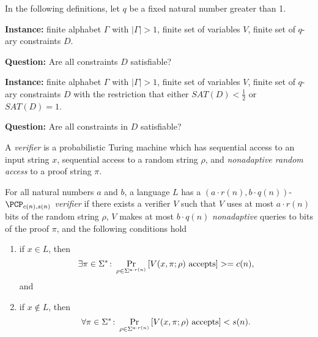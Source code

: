 \documentclass[]{article}
\begin{document}
In the following definitions, let $q$ be a fixed natural number greater than 1.

\begin{definition}
  \mbox{}

  \textbf{Instance:} finite alphabet $\Gamma$ with $|\Gamma| > 1$, finite set of variables $V$, finite set of $q$-ary constraints $D$.

  \textbf{Question:} Are all constraints $D$ satisfiable?
\end{definition}

\begin{definition}
  \mbox{}

  \textbf{Instance:} finite alphabet $\Gamma$ with $|\Gamma| > 1$, finite set of variables $V$, finite set of $q$-ary constraints $D$ with the restriction that either $SAT(D) < \frac{1}{2}$ or $SAT(D) = 1$.

  \textbf{Question:} Are all constraints in $D$ satisfiable?
\end{definition}

\begin{definition}
  A \emph{\PCP{} verifier} is a probabilistic Turing machine which has sequential access to an input string $x$, sequential access to a random string $\rho$, and \emph{nonadaptive random access} to a proof string $\pi$.
\end{definition}

\begin{definition}
  For all natural numbers $a$ and $b$, a language $L$ has a $(a \cdot r(n), b \cdot q(n))$-\emph{$\PCP_{c(n), s(n)}$ verifier} if there exists a \PCP{} verifier $V$ such that $V$ uses at most $a \cdot r(n)$ bits of the random string $\rho$, $V$ makes at most $b \cdot q(n)$ \emph{nonadaptive} queries to bits of the proof $\pi$, and the following conditions hold
  \begin{enumerate}
  \item if $x \in L$, then
    \begin{equation*}
      \exists \pi \in \Sigma^* \colon \Pr_{\rho \in \Sigma^{a \cdot r(n)}}{\left[V(x, \pi; \rho) \textnormal{ accepts}\right]} >= c(n),
    \end{equation*}
    and
  \item if $x \notin L$, then
    \begin{equation*}
      \forall \pi \in \Sigma^* \colon \Pr_{\rho \in \Sigma^{a \cdot r(n)}}{\left[V(x, \pi; \rho) \textnormal{ accepts}\right]} < s(n).
    \end{equation*}
  \end{enumerate}
\end{definition}
\end{document}
